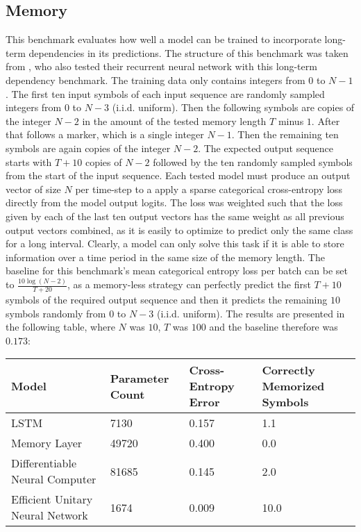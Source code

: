 \documentclass[draft,final]{vutinfth} %
\begin{document}
\subsection{Memory}
This benchmark evaluates how well a model can be trained to incorporate long-term dependencies in its predictions.
The structure of this benchmark was taken from \cite{UnitaryRNNs}, who also tested their recurrent neural network with this long-term dependency benchmark.
The training data only contains integers from $0$ to $N-1$. The first ten input symbols of each input sequence are randomly sampled integers from $0$ to $N-3$ (i.i.d. uniform). 
Then the following symbols are copies of the integer $N-2$ in the amount of the tested memory length $T$ minus $1$. 
After that follows a marker, which is a single integer $N-1$. 
Then the remaining ten symbols are again copies of the integer $N-2$. 
The expected output sequence starts with $T+10$ copies of $N-2$ followed by the ten randomly sampled symbols from the start of the input sequence.
Each tested model must produce an output vector of size $N$ per time-step to a apply a sparse categorical cross-entropy loss directly from the model output logits.
The loss was weighted such that the loss given by each of the last ten output vectors has the same weight as all previous output vectors combined, as it is easily to optimize to predict only the same class for a long interval.
Clearly, a model can only solve this task if it is able to store information over a time period in the same size of the memory length.
The baseline for this benchmark's mean categorical entropy loss per batch can be set to $\frac{10\log(N-2)}{T+20}$, as a memory-less strategy can perfectly predict the first $T+10$ symbols of the required output sequence and then it predicts the remaining $10$ symbols randomly from $0$ to $N-3$ (i.i.d. uniform).
The results are presented in the following table, where $N$ was $10$, $T$ was $100$ and the baseline therefore was $0.173$:
\begin{table}[h]
\begin{tabular}{llll}
\hline
Model & Parameter Count & Cross-Entropy Error & Correctly Memorized Symbols \\ \hline
LSTM & 7130 & 0.157 & 1.1 \\ 
Memory Layer & 49720 & 0.400 & 0.0 \\
Differentiable Neural Computer & 81685 & 0.145 & 2.0 \\
Efficient Unitary Neural Network & 1674 & 0.009 & 10.0 \\
\end{tabular}
\end{table}
\end{document}
